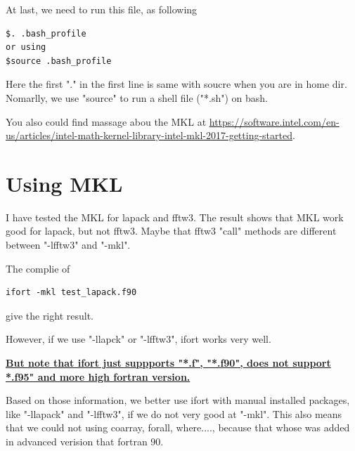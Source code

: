 At last, we need to run this file, as  following 

\begin{verbatim}
$. .bash_profile
or using
$source .bash_profile
\end{verbatim}

Here the first "." in the first line is same with soucre when you are in home dir.  Nomarlly, we use "source" to run a shell file ("*.sh") on bash.

You also could find massage abou the MKL at \url{https://software.intel.com/en-us/articles/intel-math-kernel-library-intel-mkl-2017-getting-started}.

\section{Using MKL}

I have tested the MKL for lapack and fftw3. The result shows that MKL work good for lapack, but not fftw3. Maybe that fftw3 "call" methods are different between "-lfftw3" and "-mkl".

The complie of 
\begin{verbatim}
ifort -mkl test_lapack.f90 
\end{verbatim}
give the right result.

However, if we use "-llapck" or "-lfftw3", ifort works very well. 

\underline{\textbf{But note that ifort  just suppports "*.f", "*.f90", does not support *.f95" and more high fortran version.}}

Based on those information, we better use ifort with manual installed packages, like "-llapack" and "-lfftw3", if we do not very good at "-mkl". This also means that we could not using coarray, forall, where...., because that whose was added in advanced verision that fortran 90.
 
 
